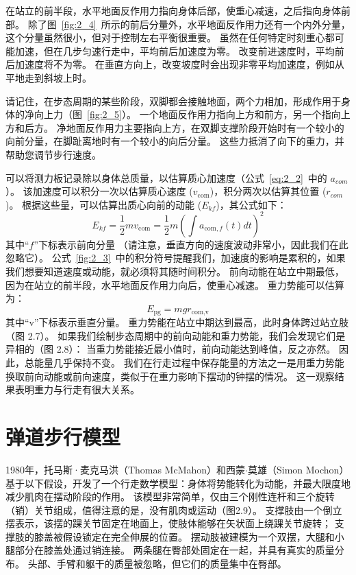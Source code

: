 在站立的前半段，水平地面反作用力指向身体后部，使重心减速，之后指向身体前部。
除了图~\ref{fig:2_4}~所示的前后分量外，水平地面反作用力还有一个内外分量，这个分量虽然很小，但对于控制左右平衡很重要。
虽然在任何特定时刻重心都可能加速，但在几步匀速行走中，平均前后加速度为零。
改变前进速度时，平均前后加速度将不为零。
在垂直方向上，改变坡度时会出现非零平均加速度，例如从平地走到斜坡上时。


请记住，在步态周期的某些阶段，双脚都会接触地面，两个力相加，形成作用于身体的净向上力（图~\ref{fig:2_5}）。
一个地面反作用力指向上方和前方，另一个指向上方和后方。
净地面反作用力主要指向上方，在双脚支撑阶段开始时有一个较小的向前分量，在脚趾离地时有一个较小的向后分量。
这些力抵消了向下的重力，并帮助您调节步行速度。


可以将测力板记录除以身体总质量，以估算质心加速度（公式~\ref{eq:2_2}~中的 $a_{com}$）。
该加速度可以积分一次以估算质心速度 ($v_{\text{com}}$)，积分两次以估算其位置 ($r_{com}$)。
根据这些量，可以估算出质心向前的动能 ($E_{kf}$)，其公式如下：
\begin{equation}
	E_{kf} = \frac{1}{2} m v_{\text{com}}
		   = \frac{1}{2} m 
		   	 ( \int a_{\text{com},f} (t) dt )^2  \label{eq:2_3}
\end{equation}
%
其中“$f$”下标表示前向分量
（请注意，垂直方向的速度波动非常小，因此我们在此忽略它）。
公式~\ref{fig:2_3}~中的积分符号提醒我们，加速度的影响是累积的，如果我们想要知道速度或动能，就必须将其随时间积分。
前向动能在站立中期最低，因为在站立的前半段，水平地面反作用力向后，使重心减速。
重力势能可以估算为：
\begin{equation}
	E_{\text{pg}} 
		= m g r_{\text{com},\text{v}} \label{eq:2_4}
\end{equation}
%
其中“v”下标表示垂直分量。
重力势能在站立中期达到最高，此时身体跨过站立肢（图 2.7）。
如果我们绘制步态周期中的前向动能和重力势能，我们会发现它们是异相的（图 2.8）：
当重力势能接近最小值时，前向动能达到峰值，反之亦然。
因此，总能量几乎保持不变。
我们在行走过程中保存能量的方法之一是用重力势能换取前向动能或前向速度，类似于在重力影响下摆动的钟摆的情况。
这一观察结果表明重力与行走有很大关系。


\section{弹道步行模型}

1980年，托马斯·麦克马洪（Thomas McMahon）和西蒙$\cdot$莫雄（Simon Mochon）基于以下假设，开发了一个行走数学模型：身体将势能转化为动能，并最大限度地减少肌肉在摆动阶段的作用。
该模型非常简单，仅由三个刚性连杆和三个旋转（销）关节组成，值得注意的是，没有肌肉或运动（图2.9）。
支撑肢由一个倒立摆表示，该摆的踝关节固定在地面上，使肢体能够在矢状面上绕踝关节旋转；
支撑肢的膝盖被假设锁定在完全伸展的位置。
摆动肢被建模为一个双摆，大腿和小腿部分在膝盖处通过销连接。
两条腿在臀部处固定在一起，并具有真实的质量分布。
头部、手臂和躯干的质量被忽略，但它们的质量集中在臀部。


